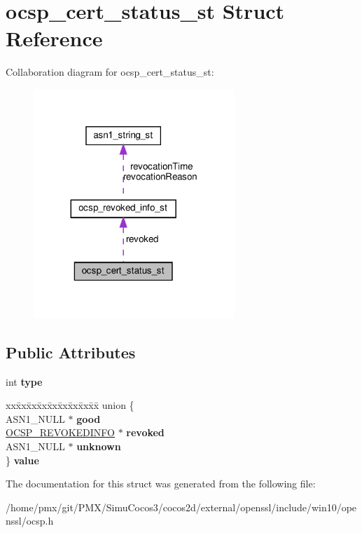 \hypertarget{structocsp__cert__status__st}{}\section{ocsp\+\_\+cert\+\_\+status\+\_\+st Struct Reference}
\label{structocsp__cert__status__st}


Collaboration diagram for ocsp\+\_\+cert\+\_\+status\+\_\+st\+:
\nopagebreak
\begin{figure}[H]
\begin{center}
\leavevmode
\includegraphics[width=215pt]{structocsp__cert__status__st__coll__graph}
\end{center}
\end{figure}
\subsection*{Public Attributes}
\begin{DoxyCompactItemize}
\item 
\mbox{\label{structocsp__cert__status__st_a8e834ed8fedd7e6709723625989a2dcf}} 
int {\bfseries type}
\item 
\mbox{\label{structocsp__cert__status__st_a69dd10d7d4bf4c64346d3784eeac7795}} 
\begin{tabbing}
xx\=xx\=xx\=xx\=xx\=xx\=xx\=xx\=xx\=\kill
union \{\\
\>ASN1\_NULL $\ast$ {\bfseries good}\\
\>\hyperlink{structocsp__revoked__info__st}{OCSP\_REVOKEDINFO} $\ast$ {\bfseries revoked}\\
\>ASN1\_NULL $\ast$ {\bfseries unknown}\\
\} {\bfseries value}\\

\end{tabbing}\end{DoxyCompactItemize}


The documentation for this struct was generated from the following file\+:\begin{DoxyCompactItemize}
\item 
/home/pmx/git/\+P\+M\+X/\+Simu\+Cocos3/cocos2d/external/openssl/include/win10/openssl/ocsp.\+h\end{DoxyCompactItemize}
